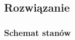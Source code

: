 \documentclass[a4paper,12pt]{extarticle}  %
\begin{document}
\subsection{Rozwiązanie}
\subsubsection{Schemat stanów}
\begin{figure}[H]
	\centering
\end{figure}
\end{document}
